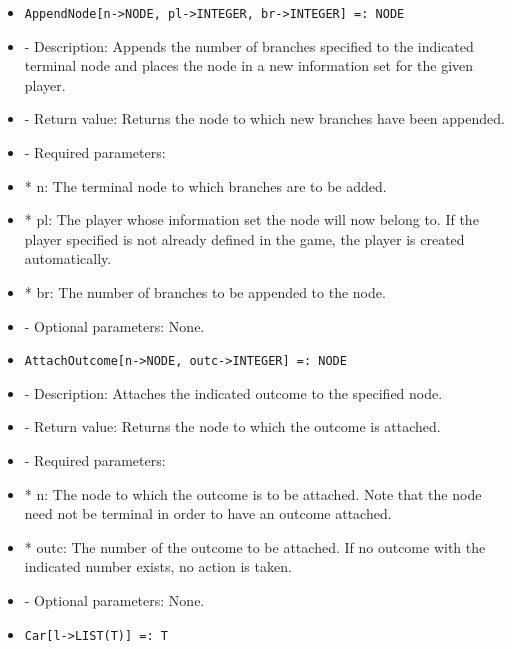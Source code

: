 \begin{itemize}

\item
\begin{verbatim}
AppendNode[n->NODE, pl->INTEGER, br->INTEGER] =: NODE
\end{verbatim}

\bd
\item
- Description:  Appends the number of branches specified to the
indicated terminal node and places the node in a new information set
for the given player.
\item
- Return value: Returns the node to which new branches have been appended.
\item
- Required parameters:

\bd
\item
*  n:  The terminal node to which branches are to be added.
\item
*  pl:  The player whose information set the node will now belong to.
If the player specified is not already defined in the game, the player
is created automatically. 
\item
*  br:  The number of branches to be appended to the node.
\ed

\item
- Optional parameters:  None.
\ed

\item
\begin{verbatim}
AttachOutcome[n->NODE, outc->INTEGER] =: NODE
\end{verbatim}

\bd
\item
- Description:  Attaches the indicated outcome to the specified node.
\item
- Return value:  Returns the node to which the outcome is attached.
\item
- Required parameters:

\bd
\item
*  n:  The node to which the outcome is to be attached.  Note that the
node need not be terminal in order to have an outcome attached.
\item
*  outc:  The number of the outcome to be attached.  If no outcome
with the indicated number exists, no action is taken.  
\ed

\item
- Optional parameters:  None.
\ed

\item

\begin{verbatim}
Car[l->LIST(T)] =: T	
\end{verbatim}


\end{itemize}
